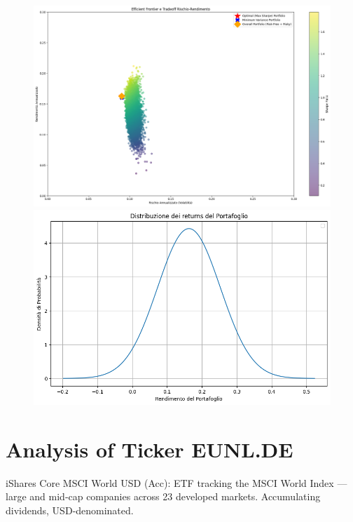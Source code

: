 \documentclass{article}%
\begin{document}
\begin{figure}[htbp]%
\begin{minipage}{0.49\textwidth}%
\includegraphics[width=\linewidth]{ticker_images/efficient_frontier.png}%
\end{minipage}%
\begin{minipage}{0.49\textwidth}%
\includegraphics[width=\linewidth]{ticker_images/portfolio_distribution.png}%
\end{minipage}%
\end{figure}

%
\newpage%
\section*{Analysis of Ticker EUNL.DE}%
\label{sec:AnalysisofTickerEUNL.DE}%
iShares Core MSCI World USD (Acc): ETF tracking the MSCI World Index — large and mid‑cap companies across 23 developed markets. Accumulating dividends, USD‑denominated.%
\end{document}
